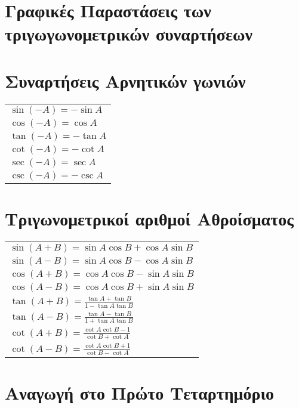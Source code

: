 \section{Γραφικές Παραστάσεις των τριγωγωνομετρικών συναρτήσεων}


\section{Συναρτήσεις Αρνητικών γωνιών}
\begin{tabular}{l} 
    $ \sin{(-A)} = - \sin{A} $ \\
    $ \cos{(-A)} = \cos{A} $ \\
    $ \tan{(-A)} = - \tan{A} $ \\
    $ \cot{(-A)} = - \cot{A} $ \\
    $ \sec{(-A)} = \sec{A} $ \\
    $ \csc{(-A)} = - \csc{A} $ 
\end{tabular}


\section{Τριγωνομετρικοί αριθμοί Αθροίσματος} 

\begin{tabular}{l}
    $ \sin{(A+B)} = \sin{A} \cos{B} + \cos{A} \sin{B} $ \\
    $ \sin{(A-B)} = \sin{A} \cos{B} - \cos{A} \sin{B} $ \\
    $ \cos{(A+B)} = \cos{A} \cos{B} - \sin{A} \sin{B} $ \\
    $ \cos{(A-B)} = \cos{A} \cos{B} + \sin{A} \sin{B} $ \\
    $ \tan{(A+B)} = \frac{\tan{A} + \tan{B}}{1 - \tan{A} \tan{B}} $ \\
    $ \tan{(A-B)} = \frac{\tan{A} - \tan{B}}{1 + \tan{A} \tan{B}} $ \\ 
    $ \cot{(A+B)} = \frac{\cot{A} \cot{B} - 1}{\cot{B} + \cot{A}} $ \\
    $ \cot{(A-B)} = \frac{\cot{A} \cot{B} + 1}{\cot{B} - \cot{A}} $ 
\end{tabular}

\section{Αναγωγή στο Πρώτο Τεταρτημόριο}

